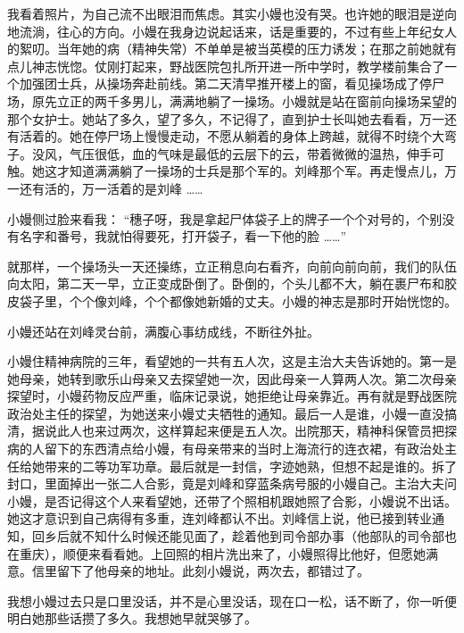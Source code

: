 \documentclass[12pt,twoside,openany]{book}
\begin{document}
我看着照片，为自己流不出眼泪而焦虑。其实小嫚也没有哭。也许她的眼泪是逆向地流淌，往心的方向。小嫚在我身边说起话来，话是重要的，不过有些上年纪女人的絮叨。当年她的病（精神失常）不单单是被当英模的压力诱发；在那之前她就有点儿神志恍惚。仗刚打起来，野战医院包扎所开进一所中学时，教学楼前集合了一个加强团士兵，从操场奔赴前线。第二天清早推开楼上的窗，看见操场成了停尸场，原先立正的两千多男儿，满满地躺了一操场。小嫚就是站在窗前向操场呆望的那个女护士。她站了多久，望了多久，不记得了，直到护士长叫她去看看，万一还有活着的。她在停尸场上慢慢走动，不愿从躺着的身体上跨越，就得不时绕个大弯子。没风，气压很低，血的气味是最低的云层下的云，带着微微的温热，伸手可触。她这才知道满满躺了一操场的士兵是那个军的。刘峰那个军。再走慢点儿，万一还有活的，万一活着的是刘峰 ……

小嫚侧过脸来看我： “穗子呀，我是拿起尸体袋子上的牌子一个个对号的，个别没有名字和番号，我就怕得要死，打开袋子，看一下他的脸 ……”

就那样，一个操场头一天还操练，立正稍息向右看齐，向前向前向前，我们的队伍向太阳，第二天一早，立正变成卧倒了。卧倒的，个头儿都不大，躺在裹尸布和胶皮袋子里，个个像刘峰，个个都像她新婚的丈夫。小嫚的神志是那时开始恍惚的。

小嫚还站在刘峰灵台前，满腹心事纺成线，不断往外扯。

小嫚住精神病院的三年，看望她的一共有五人次，这是主治大夫告诉她的。第一是她母亲，她转到歌乐山母亲又去探望她一次，因此母亲一人算两人次。第二次母亲探望时，小嫚药物反应严重，临床记录说，她拒绝让母亲靠近。再有就是野战医院政治处主任的探望，为她送来小嫚丈夫牺牲的通知。最后一人是谁，小嫚一直没搞清，据说此人也来过两次，这样算起来便是五人次。出院那天，精神科保管员把探病的人留下的东西清点给小嫚，有母亲带来的当时上海流行的连衣裙，有政治处主任给她带来的二等功军功章。最后就是一封信，字迹她熟，但想不起是谁的。拆了封口，里面掉出一张二人合影，竟是刘峰和穿蓝条病号服的小嫚自己。主治大夫问小嫚，是否记得这个人来看望她，还带了个照相机跟她照了合影，小嫚说不出话。她这才意识到自己病得有多重，连刘峰都认不出。刘峰信上说，他已接到转业通知，回乡后就不知什么时候还能见面了，趁着他到司令部办事（他部队的司令部也在重庆），顺便来看看她。上回照的相片洗出来了，小嫚照得比他好，但愿她满意。信里留下了他母亲的地址。此刻小嫚说，两次去，都错过了。

我想小嫚过去只是口里没话，并不是心里没话，现在口一松，话不断了，你一听便明白她那些话攒了多久。我想她早就哭够了。
\end{document}
